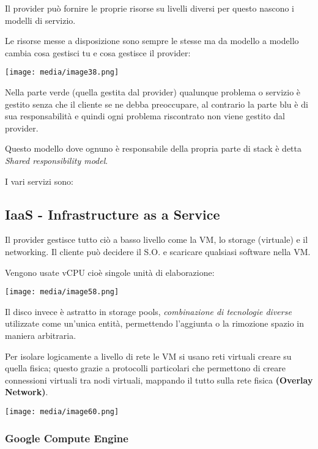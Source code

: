 Il provider può fornire le proprie risorse su livelli diversi per questo
nascono i modelli di servizio.

Le risorse messe a disposizione sono sempre le stesse ma da modello a
modello cambia cosa gestisci tu e cosa gestisce il provider:

\texttt{[image: media/image38.png]}

Nella parte verde (quella gestita dal provider) qualunque problema o
servizio è gestito senza che il cliente se ne debba preoccupare, al
contrario la parte blu è di sua responsabilità e quindi ogni problema
riscontrato non viene gestito dal provider.

Questo modello dove ognuno è responsabile della propria parte di stack è
detta \emph{Shared responsibility model}.

I vari servizi sono:

\subsection{IaaS - Infrastructure as a
Service}\label{iaas---infrastructure-as-a-service}

Il provider gestisce tutto ciò a basso livello come la VM, lo storage
(virtuale) e il networking. Il cliente può decidere il S.O. e scaricare
qualsiasi software nella VM.

Vengono usate vCPU cioè singole unità di elaborazione:

\texttt{[image: media/image58.png]}

Il disco invece è astratto in storage pools, \emph{combinazione di
tecnologie diverse} utilizzate come un'unica entità, permettendo
l'aggiunta o la rimozione spazio in maniera arbitraria.

Per isolare logicamente a livello di rete le VM si usano reti virtuali
creare su quella fisica; questo grazie a protocolli particolari che
permettono di creare connessioni virtuali tra nodi virtuali, mappando il
tutto sulla rete fisica \textbf{(Overlay Network)}.

\texttt{[image: media/image60.png]}

\subsubsection{\texorpdfstring{\textbf{Google Compute
Engine}}{Google Compute Engine}}\label{google-compute-engine}

